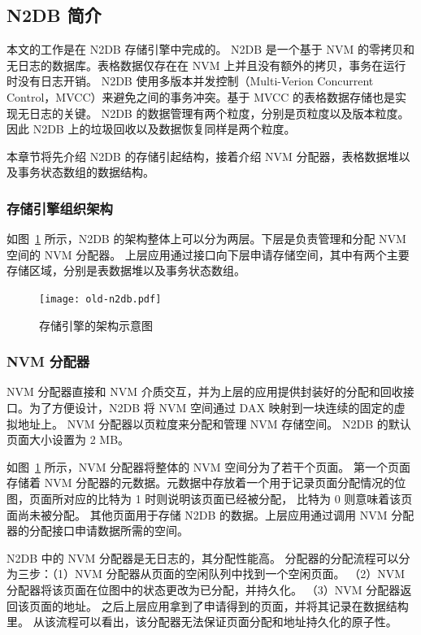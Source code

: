 \subsection{N2DB 简介}
\label{ssec:n2db}
本文的工作是在 N2DB 存储引擎中完成的。
N2DB 是一个基于 NVM 的零拷贝和无日志的数据库。表格数据仅存在在 NVM 上并且没有额外的拷贝，事务在运行时没有日志开销。
N2DB 使用多版本并发控制（Multi-Verion Concurrent Control，MVCC）来避免之间的事务冲突。基于 MVCC 的表格数据存储也是实现无日志的关键。
N2DB 的数据管理有两个粒度，分别是页粒度以及版本粒度。
因此 N2DB 上的垃圾回收以及数据恢复同样是两个粒度。

本章节将先介绍 N2DB 的存储引起结构，接着介绍 NVM 分配器，表格数据堆以及事务状态数组的数据结构。



\subsubsection{存储引擎组织架构}

如图~\ref{fig:n2db} 所示，N2DB 的架构整体上可以分为两层。下层是负责管理和分配 NVM 空间的 NVM 分配器。
上层应用通过接口向下层申请存储空间，其中有两个主要存储区域，分别是表数据堆以及事务状态数组。

\begin{figure}
    \centering
    \texttt{[image: old-n2db.pdf]}
    \caption{存储引擎的架构示意图}
    \label{fig:n2db}
\end{figure}

\subsubsection{NVM 分配器}
\label{ssec:nvm-alloc}
NVM 分配器直接和 NVM 介质交互，并为上层的应用提供封装好的分配和回收接口。为了方便设计，N2DB 将 NVM 空间通过 DAX 映射到一块连续的固定的虚拟地址上。
NVM 分配器以页粒度来分配和管理 NVM 存储空间。
N2DB 的默认页面大小设置为 2 MB。

如图~\ref{fig:n2db} 所示，NVM 分配器将整体的 NVM 空间分为了若干个页面。
第一个页面存储着 NVM 分配器的元数据。元数据中存放着一个用于记录页面分配情况的位图，页面所对应的比特为 1 时则说明该页面已经被分配，
比特为 0 则意味着该页面尚未被分配。
其他页面用于存储 N2DB 的数据。上层应用通过调用 NVM 分配器的分配接口申请数据所需的空间。

N2DB 中的 NVM 分配器是无日志的，其分配性能高。
分配器的分配流程可以分为三步：（1）NVM 分配器从页面的空闲队列中找到一个空闲页面。
（2）NVM 分配器将该页面在位图中的状态更改为已分配，并持久化。
（3）NVM 分配器返回该页面的地址。
之后上层应用拿到了申请得到的页面，并将其记录在数据结构里。
从该流程可以看出，该分配器无法保证页面分配和地址持久化的原子性。

